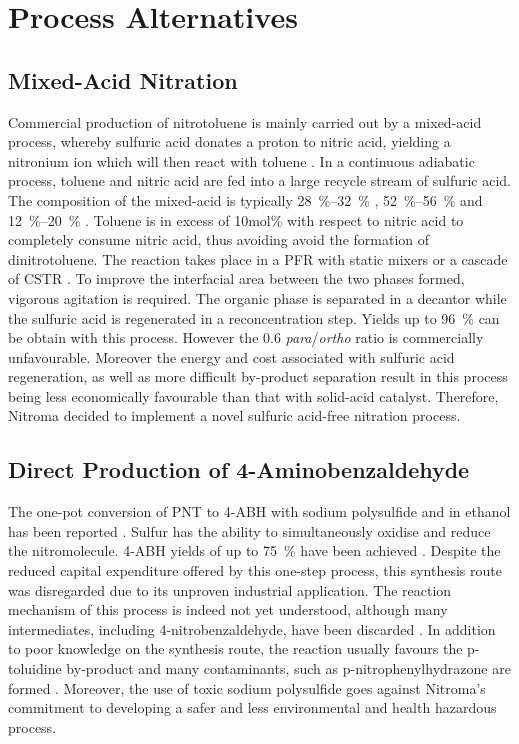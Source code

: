 \section{Process Alternatives}
\label{app:alternatives}

\subsection{Mixed-Acid Nitration}
Commercial production of nitrotoluene is mainly carried out by a mixed-acid process, whereby sulfuric acid donates a proton to nitric acid, yielding a nitronium ion which will then react with toluene \cite{halder_nitration_2007}. In a continuous adiabatic process, toluene and nitric acid are fed into a large recycle stream of sulfuric acid. The composition of the mixed-acid is typically \SIrange{28}{32}{\percent} , \SIrange{52}{56}{\percent}  and \SIrange{12}{20}{\percent}  \cite{dugal_nitrobenzene_2005}. Toluene is in excess of 10mol\% with respect to nitric acid to completely consume nitric acid, thus avoiding avoid the formation of dinitrotoluene. The reaction takes place in a PFR with static mixers or a cascade of CSTR \cite{dugal_nitrobenzene_2005}. To improve the interfacial area between the two phases formed, vigorous agitation is required. The organic phase is separated in a decantor while the sulfuric acid is regenerated in a reconcentration step. Yields up to \SI{96}{\percent} can be obtain with this process. However the 0.6 \textit{para}/\textit{ortho} ratio is commercially unfavourable. Moreover the energy and cost associated with sulfuric acid regeneration, as well as more difficult by-product separation result in this process being less economically favourable than that with solid-acid catalyst. Therefore, Nitroma decided to implement a novel sulfuric acid-free nitration process.



\subsection{Direct Production of 4-Aminobenzaldehyde}
The one-pot conversion of PNT to 4-ABH with sodium polysulfide and  in ethanol has been reported \cite{ogata_mechanism_1979}. Sulfur has the ability to simultaneously oxidise and reduce the nitromolecule. 4-ABH yields of up to \SI{75}{\percent} have been achieved \cite{beard_preparation_1944}. Despite the reduced capital expenditure offered by this one-step process, this synthesis route was disregarded due to its unproven industrial application. The reaction mechanism of this process is indeed not yet understood, although many intermediates, including 4-nitrobenzaldehyde, have been discarded \cite{ogata_mechanism_1979}. In addition to poor knowledge on the synthesis route, the reaction usually favours the p-toluidine by-product and many contaminants, such as p-nitrophenylhydrazone are formed \cite{beard_preparation_1944}. Moreover, the use of toxic sodium polysulfide goes against Nitroma's commitment to developing a safer and less environmental and health hazardous process.


